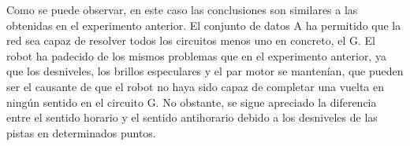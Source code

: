\begin{table}[ht!]
\ttfamily\small
\centering
{}
\caption{Tiempos por vuelta en los 12 circuitos utilizando la red Resnet-18* con el conjunto de datos B (los - indican que el modelo no ha conseguido completar una vuelta)}
\label{tab:resexperimentsB}
\end{table}

Como se puede observar, en este caso las conclusiones son similares a las obtenidas en el experimento anterior. El conjunto de datos A ha permitido que la red sea capaz de resolver todos los circuitos menos uno en concreto, el G. El robot ha padecido de los mismos problemas que en el experimento anterior, ya que los desniveles, los brillos especulares y el par motor se mantenían, que pueden ser el causante de que el robot no haya sido capaz de completar una vuelta en ningún sentido en el circuito G. No obstante, se sigue apreciado la diferencia entre el sentido horario y el sentido antihorario debido a los desniveles de las pistas en determinados puntos.

